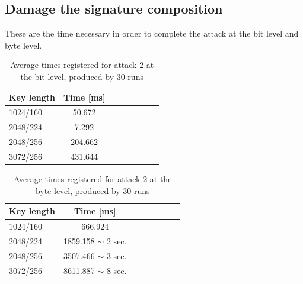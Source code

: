 \documentclass[11pt,english]{article}
\begin{document}
\subsection{Damage the signature composition}

These are the time necessary in order to complete the attack at the bit level and byte level.
\\

\begin{table}[H]
\caption{Average times registered for attack 2 at the bit level, produced by 30 runs}
\begin{center}
\begin{tabular}{l*{6}{c}r}
Key length        & Time [ms] \\
\hline
1024/160 &      50.672  \\
2048/224 &      7.292   \\
2048/256 &     204.662  \\
3072/256 &     431.644  \\ 
\end{tabular}
\end{center}
\end{table}


\begin{table}[H]
\caption{Average times registered for attack 2 at the byte level, produced by 30 runs}
\begin{center}
\begin{tabular}{l*{6}{c}r}
Key length        & Time [ms] \\
\hline
1024/160 &        666.924\\
2048/224 &       1859.158 $\mathtt{\sim}$ 2 sec. \\
2048/256 &       3507.466 $\mathtt{\sim}$ 3 sec.   \\
3072/256 &       8611.887 $\mathtt{\sim}$ 8 sec.  \\ 
\end{tabular}
\end{center}
\end{table}
\end{document}
